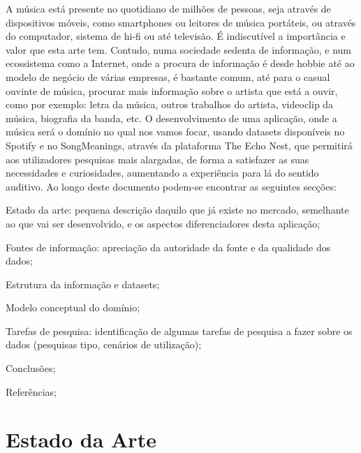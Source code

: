 \documentclass[twocolumn,twoside,11pt,a4paper]{article}
\begin{document}
A música está presente no quotidiano de milhões de pessoas, seja através de dispositivos
móveis, como smartphones ou leitores de música portáteis, ou através do computador,
sistema de hi-fi ou até televisão. É indiscutível a importância e valor que esta arte tem.
Contudo, numa sociedade sedenta de informação, e num ecossistema como a Internet, onde a
procura de informação é desde hobbie até ao modelo de negócio de várias empresas, é
bastante comum, até para o casual ouvinte de música, procurar mais informação sobre o
artista que está a ouvir, como por exemplo: letra da música, outros trabalhos do artista,
videoclip da música, biografia da banda, etc.
O desenvolvimento de uma aplicação, onde a música será o domínio no qual nos vamos focar,
usando datasets disponíveis no Spotify e no SongMeanings, através da plataforma The Echo
Nest, que permitirá aos utilizadores pesquisas mais alargadas, de forma a satisfazer as
suas necessidades e curiosidades, aumentando a experiência para lá do sentido auditivo.
Ao longo deste documento podem-se encontrar as seguintes secções:
\begin{compactitem}
  \item Estado da arte: pequena descrição daquilo que já existe no mercado, semelhante
    ao que vai ser desenvolvido, e os aspectos diferenciadores desta aplicação;
  \item Fontes de informação: apreciação da autoridade da fonte e da qualidade dos dados;
  \item Estrutura da informação e datasets;
  \item Modelo conceptual do domínio;
  \item Tarefas de pesquisa: identificação de algumas tarefas de pesquisa a fazer sobre
    os dados (pesquisas tipo, cenários de utilização);
  \item Conclusões;
  \item Referências;
\end{compactitem}


\section{Estado da Arte}\label{sec:art}
\end{document}
